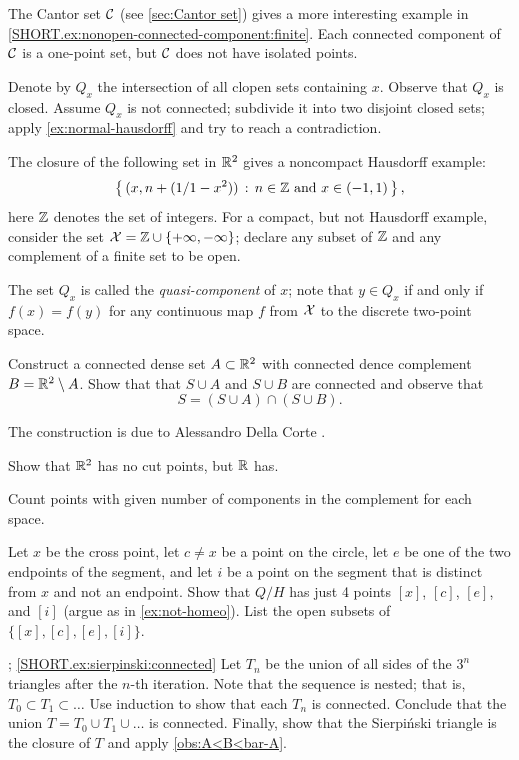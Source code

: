 The Cantor set $\mathcal{C}$ (see \ref{sec:Cantor set}) gives a more interesting example in \ref{SHORT.ex:nonopen-connected-component:finite}.
Each connected component of $\mathcal{C}$ is a one-point set, but $\mathcal{C}$ does not have isolated points.

Denote by $Q_x$ the intersection of all clopen sets containing $x$.
Observe that $Q_x$ is closed.
Assume $Q_x$ is not connected; subdivide it into two disjoint closed sets;
apply \ref{ex:normal-hausdorff} and try to reach a contradiction.

The closure of the following set in $\mathbb{R}^2$ gives a noncompact Hausdorff example:
\[\set{(x,n+\tfrac1{1-x^2})}{n\in \ZZ\ \text{and}\  x\in (-1,1)},\]
here $\mathbb{Z}$ denotes the set of integers.
For a compact, but not Hausdorff example, consider the set $\mathcal{X}=\mathbb{Z}\cup\{+\infty,-\infty\}$;
declare any subset of $\mathbb{Z}$ and any complement of a finite set to be open.

The set $Q_x$ is called the \emph{quasi-component} of $x$;
note that $y\in Q_x$ if and only if $f(x)=f(y)$ for any continuous map $f$ from $\mathcal{X}$ to the discrete two-point space.

 Construct a connected dense set $A\subset\mathbb{R}^2$ with connected dence complement $B=\mathbb{R}^2\setminus A$.
Show that that $S\cup A$ and $S\cup B$ are connected and observe that
\[S=(S\cup A)\cap (S\cup B).\]

 The construction is due to Alessandro Della Corte \cite{dellacorte}.

Show that $\mathbb{R}^2$ has no cut points, but $\mathbb{R}$ has.

Count points with given number of components in the complement for each space.

Let $x$ be the cross point,
let $c\ne x$ be a point on the circle,
let $e$ be one of the two endpoints of the segment,
and let $i$ be a point on the segment that is distinct from $x$ and not an endpoint.
Show that $Q/H$ has just 4 points $[x]$, $[c]$, $[e]$, and $[i]$ (argue as in \ref{ex:not-homeo}).
List the open subsets of $\{[x], [c], [e], [i]\}$.

\parbf{\ref{ex:sierpinski}};
\ref{SHORT.ex:sierpinski:connected}
Let $T_n$ be the union of all sides of the $3^n$ triangles after the $n$-th iteration.
Note that the sequence is nested; that is, $T_0\subset T_1\subset \dots{}$
Use induction to show that each $T_n$ is connected.
Conclude that the union $T=T_0\cup T_1\cup\ldots$ is connected.
Finally, show that the Sierpi\'nski triangle is the closure of $T$ and apply \ref{obs:A<B<bar-A}.

